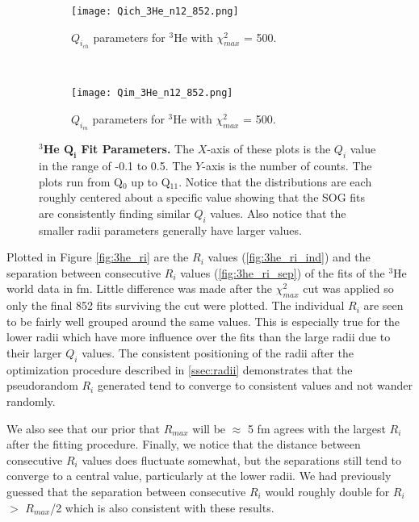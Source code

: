 \begin{figure}[!ht]
\begin{subfigure}{1.\textwidth}
  \centering
  \texttt{[image: Qich\_3He\_n12\_852.png]}
  \caption{$Q_{i_{ch}}$ parameters for $^3$He with $\chi^2_{max}$ = 500.}
  \label{fig:3he_qch}
\end{subfigure}\\
\begin{subfigure}{1.\textwidth}
  \centering
  \texttt{[image: Qim\_3He\_n12\_852.png]}
  \caption{$Q_{i_{m}}$ parameters for $^3$He with $\chi^2_{max}$ = 500.}
  \label{fig:3he_qm}
\end{subfigure}
\caption[$^3$He $Q_i$ Fit Parameters]{{\bf{$^3$He $\boldsymbol{Q_i}$ Fit Parameters.}} The $X$-axis of these plots is the $Q_i$ value in the range of -0.1 to 0.5. The $Y$-axis is the number of counts. The plots run from Q$_0$ up to Q$_{11}$. Notice that the distributions are each roughly centered about a specific value showing that the SOG fits are consistently finding similar $Q_i$ values. Also notice that the smaller radii parameters generally have larger values.}
\label{fig:3he_qi}
\end{figure}

Plotted in Figure \ref{fig:3he_ri} are the $R_i$ values (\ref{fig:3he_ri_ind}) and the separation between consecutive $R_i$ values (\ref{fig:3he_ri_sep}) of the fits of the $^3$He world data in fm. Little difference was made after the $\chi^2_{max}$ cut was applied so only the final 852 fits surviving the cut were plotted. The individual $R_i$ are seen to be fairly well grouped around the same values. This is especially true for the lower radii which have more influence over the fits than the large radii due to their larger $Q_i$ values. The consistent positioning of the radii after the optimization procedure described in \ref{ssec:radii} demonstrates that the pseudorandom $R_i$ generated tend to converge to consistent values and not wander randomly. 

We also see that our prior that $R_{max}$ will be $\approx$ 5 fm agrees with the largest $R_i$ after the fitting procedure. Finally, we notice that the distance between consecutive $R_i$ values does fluctuate somewhat, but the separations still tend to converge to a central value, particularly at the lower radii. We had previously guessed that the separation between consecutive $R_i$ would roughly double for $R_i$ $>$ $R_{max}$/2 which is also consistent with these results.

